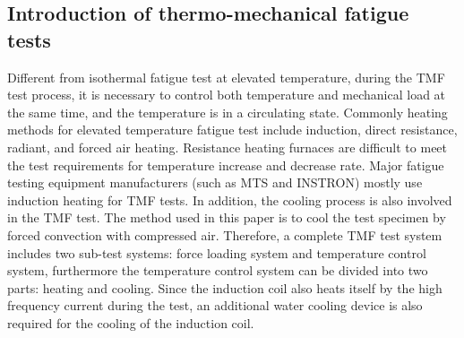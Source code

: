 \subsection{Introduction of thermo-mechanical fatigue tests}
Different from isothermal fatigue test at elevated temperature, during the TMF test process, it is necessary to control both temperature and mechanical load at the same time, and the temperature is in a circulating state.
Commonly heating methods for elevated temperature fatigue test include induction, direct resistance, radiant, and forced air heating.
Resistance heating furnaces are difficult to meet the test requirements for temperature increase and decrease rate. Major fatigue testing equipment manufacturers (such as MTS and INSTRON) mostly use induction heating for TMF tests.
In addition, the cooling process is also involved in the TMF test. The method used in this paper is to cool the test specimen by forced convection with compressed air.
Therefore, a complete TMF test system includes two sub-test systems: force loading system and temperature control system, furthermore the temperature control system can be divided into two parts: heating and cooling.
Since the induction coil also heats itself by the high frequency current during the test, an additional water cooling device is also required for the cooling of the induction coil.

